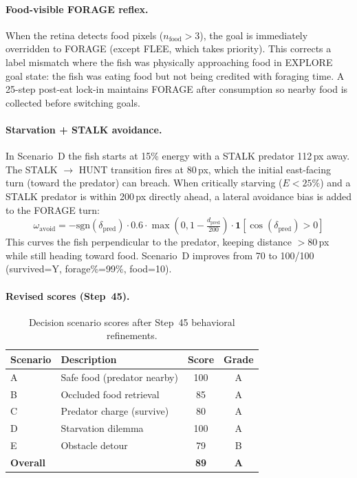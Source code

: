 \documentclass[11pt,a4paper]{article}
\begin{document}
\paragraph{Food-visible FORAGE reflex.}
When the retina detects food pixels ($n_\text{food} > 3$), the goal is
immediately overridden to FORAGE (except FLEE, which takes priority).
This corrects a label mismatch where the fish was physically approaching
food in EXPLORE goal state: the fish was eating food but not being
credited with foraging time.  A 25-step post-eat lock-in maintains FORAGE
after consumption so nearby food is collected before switching goals.

\paragraph{Starvation + STALK avoidance.}
In Scenario~D the fish starts at 15\% energy with a STALK predator 112\,px
away.  The STALK $\to$ HUNT transition fires at 80\,px, which the initial
east-facing turn (toward the predator) can breach.  When critically starving
($E < 25\%$) and a STALK predator is within 200\,px directly ahead,
a lateral avoidance bias is added to the FORAGE turn:
\begin{equation}
  \omega_\text{avoid} = -\mathrm{sgn}(\delta_\text{pred}) \cdot
  0.6 \cdot \max\!\left(0, 1 - \tfrac{d_\text{pred}}{200}\right)
  \cdot \mathbf{1}[\cos(\delta_\text{pred}) > 0]
\end{equation}
This curves the fish perpendicular to the predator, keeping distance
$> 80$\,px while still heading toward food.  Scenario~D improves from
70 to 100/100 (survived=Y, forage\%=99\%, food=10).

\paragraph{Revised scores (Step~45).}

\begin{table}[H]
\centering
\caption{Decision scenario scores after Step~45 behavioral refinements.}
\label{tab:scenario_step45}
\begin{tabular}{llcc}
\hline
Scenario & Description & Score & Grade \\
\hline
A & Safe food (predator nearby)  & 100 & A \\
B & Occluded food retrieval       & 85  & A \\
C & Predator charge (survive)     & 80  & A \\
D & Starvation dilemma            & 100 & A \\
E & Obstacle detour               & 79  & B \\
\hline
\textbf{Overall} & & \textbf{89} & \textbf{A} \\
\hline
\end{tabular}
\end{table}
\end{document}

